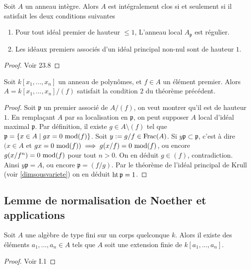 \begin{thm}\label{SerreCritere}
Soit $A$ un anneau intègre. Alors $A$ est intégralement clos si et seulement si il satisfait les deux conditions suivantes
\begin{enumerate}
\item Pour tout idéal premier de hauteur $\leq 1$, L'anneau local $A_\mathfrak{p}$ est régulier.
\item Les idéaux premiers associés d'un idéal principal non-nul sont de hauteur $1$.
\end{enumerate}
\end{thm}
\begin{proof}
Voir \cite{Matsumura} 23.8
\end{proof}

\begin{prop}\label{SerreCritere2}
Soit $k[x_1,...,x_n]$ un anneau de polynômes, et $f\in A$ un élément premier. Alors $A=k[x_1,...,x_n]/(f)$ satisfait la condition $2$ du théorème précédent. 
\end{prop}
\begin{proof}
Soit $\mathfrak{p}$ un premier associé de $A/(f)$, on veut montrer qu'il est de hauteur $1$. En remplaçant $A$ par sa localisation en $\mathfrak{p}$, on peut supposer $A$ local d'idéal maximal $\mathfrak{p}$. Par définition, il existe $g\in A\setminus (f) $ tel que $\mathfrak{p}=\lbrace x\in A\mid gx=0 \,\operatorname{mod} (f)\rbrace$. Soit $y:=g/f\in \operatorname{Frac}(A)$. Si $y\mathfrak{p}\subset\mathfrak{p}$, c'est à dire $(x\in A$ et $gx=0 \,\operatorname{mod} (f))\implies g(x/f)=0\,\operatorname{mod} (f)$, ou encore $g(x/f^n)=0\,\operatorname{mod} (f)$ pour tout $n>0$. On en déduit $g\in (f)$, contradiction. Ainsi $y\mathfrak{p}=A$, ou encore $\mathfrak{p}=(f/g)$. Par le théorème de l'idéal principal de Krull (voir \ref{dimsousvariete}) on en déduit $\operatorname{ht} \mathfrak{p}=1$.
\end{proof}

\subsection{Lemme de normalisation de Noether et applications}

\begin{thm}\label{NoetherNormalisation}
Soit $A$ une algèbre de type fini sur un corps quelconque $k$. Alors il existe des éléments $a_1,...,a_n\in A$ tels que $A$ soit une extension finie de $k[a_1,...,a_n]$.
\end{thm}
\begin{proof}
Voir \cite{MumfordRedBook} I.1
\end{proof}

